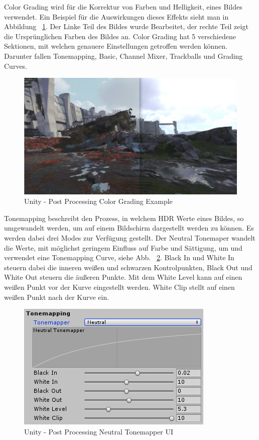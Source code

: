 Color Grading wird für die Korrektur von Farben und Helligkeit, eines Bildes verwendet.
Ein Beispiel für die Auswirkungen dieses Effekts sieht man in Abbildung ~\ref{fig:unity-post-processing-color-grading-example}.
Der Linke Teil des Bildes wurde Bearbeitet, der rechte Teil zeigt die Ursprünglichen Farben des Bildes an.
Color Grading hat 5 verschiedene Sektionen, mit welchen genauere Einstellungen getroffen werden können.
Darunter fallen Tonemapping, Basic, Channel Mixer, Trackballs und Grading Curves.
~\cite{Unity_Post_Processing_ColorGrading_2022}
\begin {figure}
    \centering
    \includegraphics[scale=0.4]{pics/unity-post-processing-color-grading-before-after}
    \caption{Unity - Post Processing Color Grading Example}
    \label{fig:unity-post-processing-color-grading-example}
\end {figure}

Tonemapping beschreibt den Prozess, in welchem HDR Werte eines Bildes, so umgewandelt werden, um auf einem Bildschirm dargestellt werden zu können.
Es werden dabei drei Modes zur Verfügung gestellt.
Der Neutral Tonemaper wandelt die Werte, mit möglichst geringem Einfluss auf Farbe und Sättigung, um und verwendet eine Tonemapping Curve, siehe Abb. ~\ref{fig:unity-post-processing-neutral-tonemapper-ui}.
Black In und White In steuern dabei die inneren weißen und schwarzen Kontrolpunkten, Black Out und White Out steuern die äußeren Punkte.
Mit dem White Level kann auf einen weißen Punkt vor der Kurve eingestellt werden.
White Clip stellt auf einen weißen Punkt nach der Kurve ein.
\begin {figure}
    \centering
    \includegraphics[scale=0.9]{pics/unity-post-processing-color-grading-neutralTonemapper}
    \caption{Unity - Post Processing Neutral Tonemapper UI}
    \label{fig:unity-post-processing-neutral-tonemapper-ui}
\end {figure}

